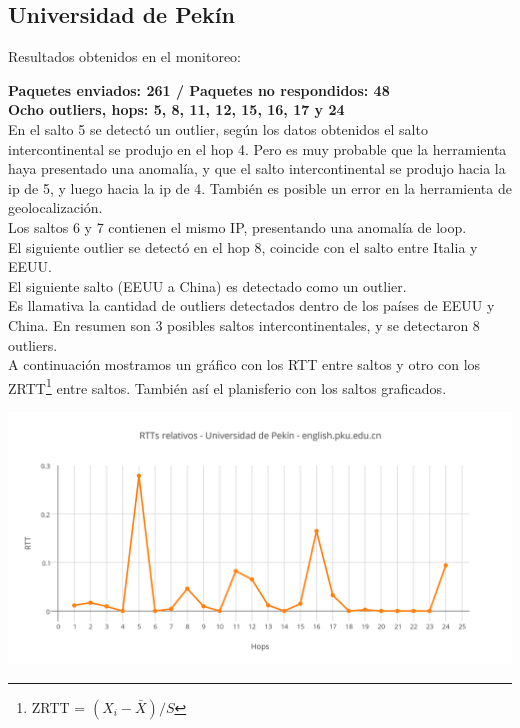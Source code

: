 \subsection{Universidad de Pekín}

Resultados obtenidos en el monitoreo:\\

\smallskip

\bigskip

\textbf{Paquetes enviados: 261 / Paquetes no respondidos: 48}\\

\textbf{Ocho outliers, hops: 5, 8, 11, 12, 15, 16, 17 y 24}\\


En el salto 5 se detectó un outlier, según los datos obtenidos el salto intercontinental se produjo en el hop 4.
Pero es muy probable
que la herramienta haya presentado una anomalía, y que el salto intercontinental se produjo hacia la ip de 5, y luego
hacia la ip de 4. También es posible un error en la herramienta de geolocalización.\\
Los saltos 6 y 7 contienen el mismo IP, presentando una anomalía de loop.\\
El siguiente outlier se detectó en el hop 8, coincide con el salto entre Italia y EEUU.\\
El siguiente salto (EEUU a China) es detectado como un outlier.\\
Es llamativa la cantidad de outliers detectados dentro de los países de EEUU y China. En resumen son 3 posibles saltos
intercontinentales, y se detectaron 8 outliers.\\

A continuación mostramos un gráfico con los RTT entre saltos y otro con los ZRTT\footnote{ZRTT = $(X_i - \bar{X}) / S$}  entre saltos. También así el planisferio con los saltos graficados.

\includegraphics[scale=0.65]{imagenes/pekin/RTTs.png} 

